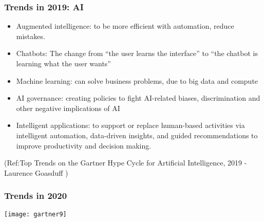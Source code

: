 \begin{frame}[fragile]\frametitle{Trends in 2019: AI}
\begin{itemize}
\item Augmented intelligence: to be more efficient with automation, reduce mistakes.
\item Chatbots: The change from “the user learns the interface” to “the chatbot is learning what the user wants” 
\item Machine learning: can solve business problems, due to big data and compute
\item AI governance: creating policies to fight AI-related biases, discrimination and other negative implications of AI
\item Intelligent applications: to support or replace human-based activities via intelligent automation, data-driven insights, and guided recommendations to improve productivity and decision making. 

\end{itemize}


{\tiny (Ref:Top Trends on the Gartner Hype Cycle for Artificial Intelligence, 2019 - 
Laurence Goasduff )}

\end{frame}

\begin{frame}[fragile]\frametitle{Trends in 2020}

\begin{center}
\texttt{[image: gartner9]}
\end{center}


\end{frame}

